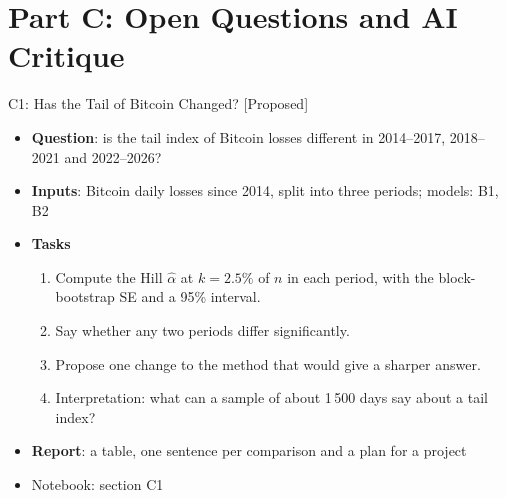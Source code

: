 \section{Part C: Open Questions and AI Critique}

\begin{frame}{C1: Has the Tail of Bitcoin Changed? [Proposed]}
\itemsize{\footnotesize}
\begin{itemize}
\item \textbf{Question}: is the tail index of Bitcoin losses different in 2014--2017, 2018--2021 and 2022--2026?
\item \textbf{Inputs}: Bitcoin daily losses since 2014, split into three periods; models: B1, B2
\item \textbf{Tasks}
\begin{enumerate}
    \item Compute the Hill $\hat\alpha$ at $k = 2.5\%$ of $n$ in each period, with the block-bootstrap SE and a 95\% interval.
    \item Say whether any two periods differ significantly.
    \item Propose one change to the method that would give a sharper answer.
    \item Interpretation: what can a sample of about 1\,500 days say about a tail index?
\end{enumerate}
\item \textbf{Report}: a table, one sentence per comparison and a plan for a project
\item Notebook: section C1
\end{itemize}
\end{frame}

